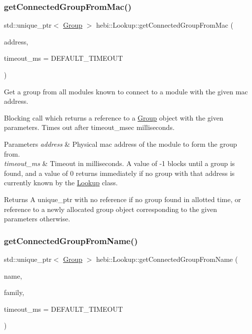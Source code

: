 \subsubsection{\texorpdfstring{get\+Connected\+Group\+From\+Mac()}{getConnectedGroupFromMac()}}
{\footnotesize\ttfamily std\+::unique\+\_\+ptr$<$ \hyperlink{classhebi_1_1Group}{Group} $>$ hebi\+::\+Lookup\+::get\+Connected\+Group\+From\+Mac (\begin{DoxyParamCaption}\item[{const \hyperlink{classhebi_1_1MacAddress}{Mac\+Address} \&}]{address,  }\item[{long}]{timeout\+\_\+ms = {\ttfamily DEFAULT\+\_\+TIMEOUT} }\end{DoxyParamCaption})}



Get a group from all modules known to connect to a module with the given mac address. 

Blocking call which returns a reference to a \hyperlink{classhebi_1_1Group}{Group} object with the given parameters. Times out after timeout\+\_\+msec milliseconds.


\begin{DoxyParams}{Parameters}
{\em address} & Physical mac address of the module to form the group from. \\
\hline
{\em timeout\+\_\+ms} & Timeout in milliseconds. A value of -\/1 blocks until a group is found, and a value of 0 returns immediately if no group with that address is currently known by the \hyperlink{classhebi_1_1Lookup}{Lookup} class. \\
\hline
\end{DoxyParams}
\begin{DoxyReturn}{Returns}
A unique\+\_\+ptr with no reference if no group found in allotted time, or reference to a newly allocated group object corresponding to the given parameters otherwise. 
\end{DoxyReturn}
\mbox{\label{classhebi_1_1Lookup_afb22de42b4310292bd9a0a5848e3f3e6}} 
\subsubsection{\texorpdfstring{get\+Connected\+Group\+From\+Name()}{getConnectedGroupFromName()}}
{\footnotesize\ttfamily std\+::unique\+\_\+ptr$<$ \hyperlink{classhebi_1_1Group}{Group} $>$ hebi\+::\+Lookup\+::get\+Connected\+Group\+From\+Name (\begin{DoxyParamCaption}\item[{const std\+::string \&}]{name,  }\item[{const std\+::string \&}]{family,  }\item[{long}]{timeout\+\_\+ms = {\ttfamily DEFAULT\+\_\+TIMEOUT} }\end{DoxyParamCaption})}



